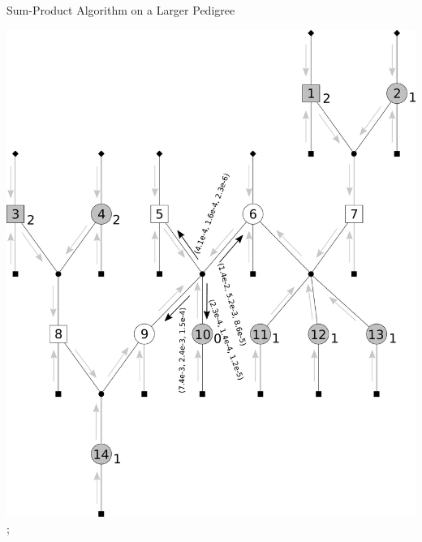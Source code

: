 \documentclass[letter,graphicx]{beamer}
\begin{document}
\begin{frame}{Sum-Product Algorithm on a Larger Pedigree} 
\begin{center} 
\includegraphics[height = 0.8\textheight]{./images/mg-example-step7.pdf}; 
\end{center}
\end{frame}
\end{document}
